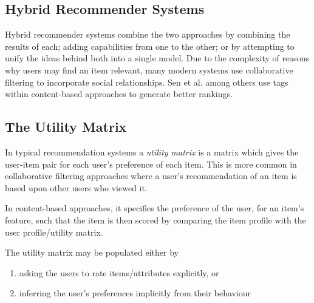 \subsection{Hybrid Recommender Systems}

Hybrid recommender systems combine the two approaches by combining the results of each; adding capabilities from one to the other; or by attempting to unify the ideas behind both into a single model. Due to the complexity of reasons why users may find an item relevant, many modern systems \cite{ReferralWeb} use collaborative filtering to incorporate social relationships. Sen et al. \cite{SenTagommender} among others use tags within content-based approaches to generate better rankings. 

\subsection{The Utility Matrix}

In typical recommendation systems a \textit{utility matrix} is a matrix which gives the user-item pair for each user's preference of each item. This is more common in collaborative filtering approaches where a user's recommendation of an item is based upon other users who viewed it. 

In content-based approaches, it specifies the preference of the user, for an item's feature, such that the item is then scored by comparing the item profile with the user profile/utility matrix.

The utility matrix may be populated either by
\begin{enumerate}
  \item asking the users to rate items/attributes explicitly, or
  \item inferring the user's preferences implicitly from their behaviour
\end{enumerate}
